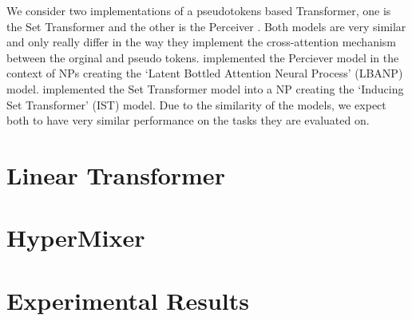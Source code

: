 \documentclass[../../main.tex]{subfiles}
\begin{document}
We consider two implementations of a pseudotokens based Transformer, one is the Set Transformer \parencite{lee2019set} and the other is the Perceiver \parencite{jaegle2021perceiver}. Both models are very similar and only really differ in the way they implement the cross-attention mechanism between the orginal and pseudo tokens. \parencite{feng2023latent} implemented the Perciever model in the context of NPs creating the `Latent Bottled Attention Neural Process' (LBANP) model. \cite{anonymous2024translationequivariant} implemented the Set Transformer model into a NP creating the `Inducing Set Transformer' (IST) model. Due to the similarity of the models, we expect both to have very similar performance on the tasks they are evaluated on.


\section{Linear Transformer}

\section{HyperMixer}

\section{Experimental Results}



\ifSubfilesClassLoaded{%
    \printbibliography{}
}{} 
\end{document}
